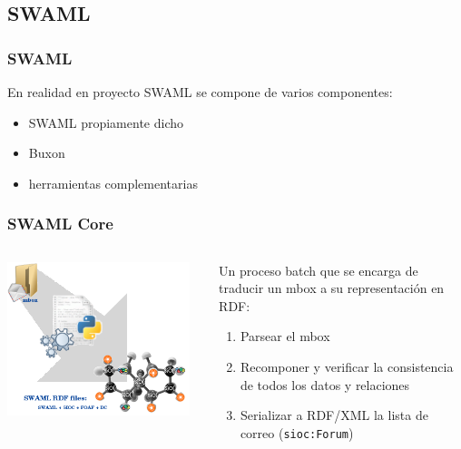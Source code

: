 \documentclass[spanish,notes=hide]{beamer}
\begin{document}
\subsection{SWAML}
\frame
{
  \frametitle{SWAML}

  En realidad en proyecto SWAML se compone de varios componentes:

  \begin{itemize}
   \item SWAML propiamente dicho
   \item Buxon
   \item herramientas complementarias
  \end{itemize}
}
\frame
{
  \frametitle{SWAML Core}
  \begin{columns}
   \begin{column}{0.5\textwidth}
	\includegraphics[width=0.95\textwidth]{images/swaml.png}
   \end{column}
   \begin{column}{0.5\textwidth}
	Un proceso batch que se encarga de traducir un mbox a su representación en RDF:
	\begin{enumerate}
	 \item Parsear el mbox
	 \item Recomponer y verificar la consistencia de todos los datos y relaciones
	 \item Serializar a RDF/XML la lista de correo (\texttt{sioc:Forum})
	\end{enumerate}
   \end{column}
  \end{columns}
}
\end{document}
